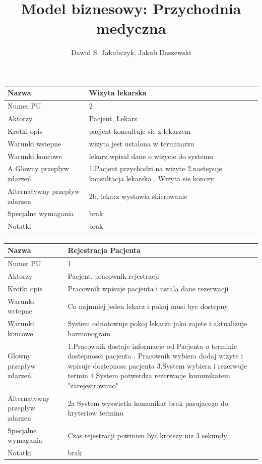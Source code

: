 \documentclass{article}
\author{Dawid S. Jakubczyk, Jakub Daszewski}
\title{Model biznesowy: Przychodnia medyczna}
\begin{document}
	\begin{tabular}{|m{10em}|m{20em}|}
		\hline
		Nazwa &Wizyta lekarska \\
		\hline
		Numer PU & 2\\
		\hline
		Aktorzy & Pacjent, Lekarz\\
		\hline
		Krotki opis & pacjent konsultuje sie z lekarzem\\
		\hline
		Warunki wstepne & wizyta jest ustalona w terminarzu\\
		\hline
		Warunki koncowe & lekarz wpisal dane o wizycie do systemu\\
	
		\hline
		A
		Glowny przepływ zdarzeń& 1.Pacjent przychodzi na wizyte \newline
								 2.nastepuje konsultacja lekarska \newline
								 3. Wizyta sie konczy  \\
		\hline
		Alternatywny przeplyw zdarzen &  2b. lekarz wystawia skierowanie\\
		\hline
		Specjalne wymagania & brak\\
		\hline
		Notatki& brak\\
		\hline
	\end{tabular}
	\paragraph{}
	\begin{tabular}{|m{10em}|m{20em}|}
		\hline		
		Nazwa &Rejestracja Pacjenta \\
		\hline
		Numer PU & 1\\
		\hline
		Aktorzy & Pacjent, pracownik rejestracji\\
		\hline
		Krotki opis & Pracownik wpisuje pacjenta i ustala dane rezerwacji\\
		\hline
		Warunki wstepne & Co najmniej jeden lekarz i pokoj musi byc dostepny\\
		\hline
		Warunki koncowe & System odnotowuje pokoj lekarza jako zajete i aktualizuje harmonogram\\
		\hline
		Glowny przepływ zdarzeń& 1.Pracownik dostaje informacje od Pacjenta o terminie dostepnosci pacjenta 
		\newline 2. Pracownik wybiera dodaj wizyte i wpisuje dostepnosc pacjenta 
		\newline 3.System wybiera i rezerwuje termin 
		\newline 4.System potwerdza rezerwacje komunikatem "zarejestrowano"\\
		\hline
		Alternatywny przeplyw zdarzen &  2a System wyswietla komunikat brak pasujacego do kryteriow terminu\\
		\hline
		Specjalne wymagania & Czas rejestracji powinien byc krotszy niz 3 sekundy\\
		\hline
		Notatki& brak\\
		\hline
	\end{tabular}
\end{document}
